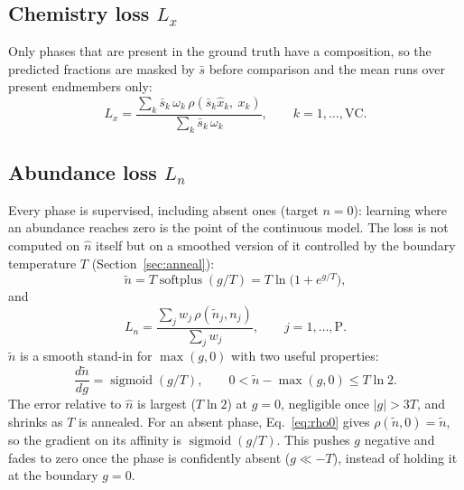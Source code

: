 \documentclass[11pt]{article}
\DeclareMathOperator{\softplus}{softplus}
\begin{document}
\subsection{Chemistry loss $L_x$}
Only phases that are present in the ground truth have a composition, so the predicted
fractions are masked by $\bar s$ before comparison and the mean runs over present
endmembers only:
\begin{equation}
  L_x = \frac{\sum_k \bar s_k\, \omega_k\, \rho(\bar s_k \hat x_k,\ x_k)}{\sum_k \bar s_k\, \omega_k},
  \qquad k = 1,\dots,\text{VC}.
\end{equation}

\subsection{Abundance loss $L_n$}
Every phase is supervised, including absent ones (target $n=0$): learning where an
abundance reaches zero is the point of the continuous model. The loss is not computed on
$\hat n$ itself but on a smoothed version of it controlled by the boundary temperature
$T$ (Section~\ref{sec:anneal}):
\begin{equation}
  \tilde n = T \softplus(g/T) = T \ln\!\big(1 + e^{g/T}\big),
  \label{eq:smooth}
\end{equation}
and
\begin{equation}
  L_n = \frac{\sum_j w_j\, \rho(\tilde n_j, n_j)}{\sum_j w_j},
  \qquad j = 1,\dots,\text{P}.
\end{equation}
$\tilde n$ is a smooth stand-in for $\max(g,0)$ with two useful properties:
\begin{equation}
  \frac{d\tilde n}{dg} = \operatorname{sigmoid}(g/T),
  \qquad
  0 < \tilde n - \max(g,0) \le T \ln 2 .
  \label{eq:smoothprops}
\end{equation}
The error relative to $\hat n$ is largest ($T\ln 2$) at $g = 0$, negligible once
$|g| > 3T$, and shrinks as $T$ is annealed. For an absent phase, Eq.~\eqref{eq:rho0} gives
$\rho(\tilde n, 0) = \tilde n$, so the gradient on its affinity is
$\operatorname{sigmoid}(g/T)$. This pushes $g$ negative and fades to zero once the phase
is confidently absent ($g \ll -T$), instead of holding it at the boundary $g=0$.
\end{document}

